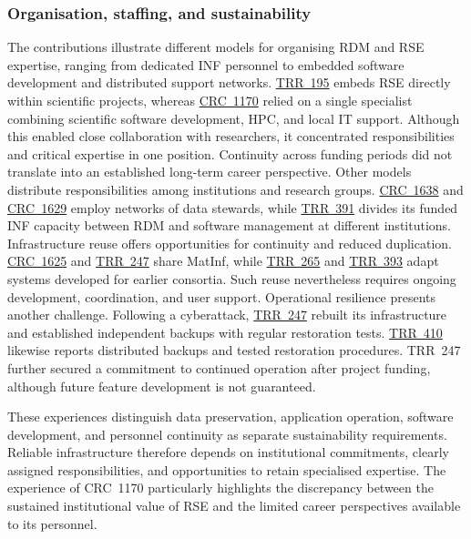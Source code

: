 \documentclass{eceasst}
\begin{document}
\subsubsection{Organisation, staffing, and sustainability}
The contributions illustrate different models for
organising RDM and RSE expertise, ranging from
dedicated INF personnel to embedded software
development and distributed support networks.
\hyperref[subsec:trr195]{TRR~195} embeds RSE
directly within scientific projects, whereas
\hyperref[subsec:crc1170]{CRC~1170} relied on
a single specialist combining scientific software
development, HPC, and local IT support.
Although this enabled close collaboration with
researchers, it concentrated responsibilities
and critical expertise in one position.
Continuity across funding periods did not
translate into an established long-term career
perspective.
Other models distribute responsibilities among
institutions and research groups.
\hyperref[subsec:crc1638]{CRC~1638} and
\hyperref[subsec:crc1629]{CRC~1629} employ
networks of data stewards, while
\hyperref[subsec:trr391]{TRR~391} divides its
funded INF capacity between RDM and software
management at different institutions.
Infrastructure reuse offers opportunities for
continuity and reduced duplication.
\hyperref[subsec:crc1625]{CRC~1625} and
\hyperref[subsec:trr247]{TRR~247} share MatInf,
while \hyperref[subsec:trr265]{TRR~265} and
\hyperref[subsec:trr393]{TRR~393} adapt systems
developed for earlier consortia.
Such reuse nevertheless requires ongoing
development, coordination, and user support.
Operational resilience presents another challenge.
Following a cyberattack,
\hyperref[subsec:trr247]{TRR~247} rebuilt its
infrastructure and established independent backups
with regular restoration tests.
\hyperref[subsec:trr410]{TRR~410} likewise
reports distributed backups and tested restoration
procedures. TRR~247 further secured a commitment
to continued operation after project funding,
although future feature development is not guaranteed.

These experiences distinguish data preservation,
application operation, software development, and
personnel continuity as separate sustainability
requirements. Reliable infrastructure therefore
depends on institutional commitments, clearly
assigned responsibilities, and opportunities
to retain specialised expertise.
The experience of CRC~1170 particularly highlights
the discrepancy between the sustained institutional
value of RSE and the limited career perspectives
available to its personnel.
\end{document}
